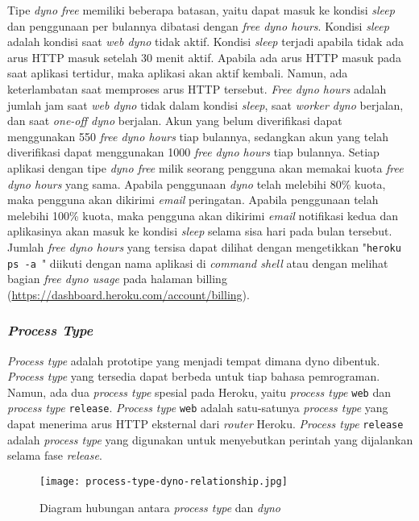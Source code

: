 Tipe \textit{dyno free} memiliki beberapa batasan, yaitu dapat masuk ke kondisi \textit{sleep} dan penggunaan per bulannya dibatasi dengan \textit{free dyno hours}. Kondisi \textit{sleep} adalah kondisi saat \textit{web dyno} tidak aktif. Kondisi \textit{sleep} terjadi apabila tidak ada arus HTTP masuk setelah 30 menit aktif. Apabila ada arus HTTP masuk pada saat aplikasi tertidur, maka aplikasi akan aktif kembali. Namun, ada keterlambatan saat memproses arus HTTP tersebut. \textit{Free dyno hours} adalah jumlah jam saat \textit{web dyno} tidak dalam kondisi \textit{sleep}, saat \textit{worker dyno} berjalan, dan saat \textit{one-off dyno} berjalan. Akun yang belum diverifikasi dapat menggunakan 550 \textit{free dyno hours} tiap bulannya, sedangkan akun yang telah diverifikasi dapat menggunakan 1000 \textit{free dyno hours} tiap bulannya. Setiap aplikasi dengan tipe \textit{dyno free} milik seorang pengguna akan memakai kuota \textit{free dyno hours} yang sama. Apabila penggunaan \textit{dyno} telah melebihi 80\% kuota, maka pengguna akan dikirimi \textit{email} peringatan. Apabila penggunaan telah melebihi 100\% kuota, maka pengguna akan dikirimi \textit{email} notifikasi kedua dan aplikasinya akan masuk ke kondisi \textit{sleep} selama sisa hari pada bulan tersebut. Jumlah \textit{free dyno hours} yang tersisa dapat dilihat dengan mengetikkan "\texttt{heroku ps -a }" diikuti dengan nama aplikasi di \textit{command shell} atau dengan melihat bagian \textit{free dyno usage} pada halaman billing (\url{https://dashboard.heroku.com/account/billing}).

\subsubsection{\textit{Process Type}}
\textit{Process type} adalah prototipe yang menjadi tempat dimana dyno dibentuk. \textit{Process type} yang tersedia dapat berbeda untuk tiap bahasa pemrograman. Namun, ada dua \textit{process type} spesial pada Heroku, yaitu \textit{process type} \texttt{web} dan \textit{process type} \texttt{release}. \textit{Process type} \texttt{web} adalah satu-satunya \textit{process type} yang dapat menerima arus HTTP eksternal dari \textit{router} Heroku. \textit{Process type} \texttt{release} adalah \textit{process type} yang digunakan untuk menyebutkan perintah yang dijalankan selama fase \textit{release}.

\begin{figure}[H]
	\centering  
	\texttt{[image: process-type-dyno-relationship.jpg]}  
	\caption[Diagram hubungan antara \textit{process type} dan \textit{dyno}]{Diagram hubungan antara \textit{process type} dan \textit{dyno}} 
	\label{fig:process-type-dyno-relationship} 
\end{figure}

